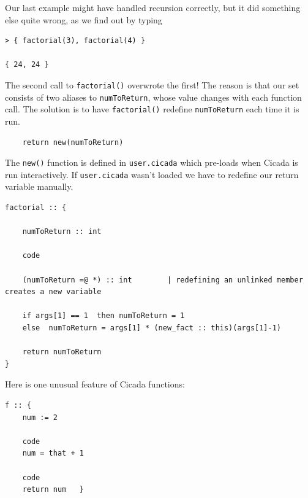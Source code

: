 \documentclass{article}
\newenvironment{code}{
       \begin{list}{}{
               \setlength{\leftmargin}{.4in}
               \setlength{\rightmargin}{0in}
               \setlength{\topsep}{.2in}
       }
       \small
       \item[] }
       { \end{list}   }
\begin{document}
Our last example might have handled recursion correctly, but it did something else quite wrong, as we find out by typing

\begin{code} \begin{verbatim}
> { factorial(3), factorial(4) }

{ 24, 24 }
\end{verbatim} \end{code}

\noindent The second call to \verb#factorial()# overwrote the first!  The reason is that our set consists of two aliases to \verb#numToReturn#, whose value changes with each function call.  The solution is to have \verb#factorial()# redefine \verb#numToReturn# each time it is run.

\begin{code} \begin{verbatim}
    return new(numToReturn)
\end{verbatim} \end{code}

\noindent The \verb#new()# function is defined in \verb#user.cicada# which pre-loads when Cicada is run interactively.  If \verb#user.cicada# wasn't loaded we have to redefine our return variable manually.

\begin{code} \begin{verbatim}
factorial :: {
    
    numToReturn :: int
    
    code
    
    (numToReturn =@ *) :: int        | redefining an unlinked member creates a new variable
    
    if args[1] == 1  then numToReturn = 1
    else  numToReturn = args[1] * (new_fact :: this)(args[1]-1)
    
    return numToReturn
}
\end{verbatim} \end{code}

Here is one unusual feature of Cicada functions:

\begin{code} \begin{verbatim}
f :: {
    num := 2
    
    code
    num = that + 1
    
    code
    return num   }
\end{verbatim} \end{code}
\end{document}
